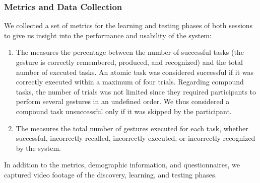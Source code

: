 \subsubsection{Metrics and Data Collection}
We collected a set of metrics for the learning and testing phases of both sessions to give us insight into the performance and usability of the system:
\begin{enumerate}
    \item The  measures the percentage between the number of successful tasks (\ie the gesture is correctly remembered, produced, and recognized) and the total number of executed tasks. An atomic task was considered successful if it was correctly executed within a maximum of four trials. Regarding compound tasks, the number of trials was not limited since they required participants to perform several gestures in an undefined order. We thus considered a compound task unsuccessful only if it was skipped by the participant.
    \item The  measures the total number of gestures executed for each task, whether successful, incorrectly recalled, incorrectly executed, or incorrectly recognized by the system.
\end{enumerate}
In addition to the metrics, demographic information, and questionnaires, we captured video footage of the discovery, learning, and testing phases.

